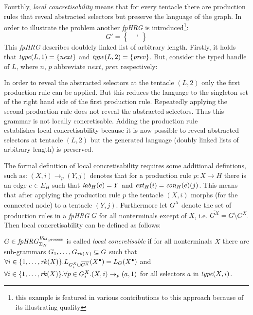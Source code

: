 	Fourthly, \emph{local concretisability} means that for every tentacle there
	are production rules that reveal abstracted selectors but preserve the
	language of the graph. In order to illustrate the problem another
	\emph{\ac{fpHRG}} is introduced\footnote{this example is featured in
		various contributions to this approach \cites{InformalGraphGrammars}
		{InductivePredicates} because of its illustrating quality}:
	\begin{equation*}
		\label{eq:G'}
		G' = \left\{
			\begin{aligned}
				&,\\
				&
			\end{aligned}
		\right\}
	\end{equation*}
	This \emph{\ac{fpHRG}} describes doublely linked list of arbitrary length.
	Firstly, it holds that
	$\mathit{type}(L,1) = \{\mathit{next}\}$ and $\mathit{type}(L,2) = \{\mathit{prev}\}$. But,
	consider the typed handle of $L$, where $n$, $p$ abbreviate $\mathit{next}$,
	$\mathit{prev}$ respectively:
	\begin{center}
		
	\end{center}
	In order to reveal the abstracted selectors at the tentacle $(L,2)$ only
	the first production rule can be applied. But this reduces the language to
	the singleton set of the right hand side of the first production rule.
	Repeatedly applying the second production rule does not reveal the
	abstracted selectors. Thus this grammar is not locally concretisable.
	Adding the production rule
	\begin{equation*}
		\label{eq:listrule3}
		
	\end{equation*}
	establishes local concretisability because it is now possible to reveal
	abstracted selectors at tentacle $(L,2)$ but the generated language (doubly
	linked lists of arbitrary length) is preserved.
	
	The formal definition of local concretisability requires some additional
	defintions, such as: $(X, i)\rightarrow_{p}(Y,j)$ denotes that for a
	production rule $p\colon X\rightarrow H$ there is an edge $e\in E_{H}$ such that
	$\mathit{lab}_{H}(e) = Y$ and $\mathit{ext}_{H}(i) = \mathit{con}_{H}(e)(j)$. This means that after
	applying the production rule $p$ the tentacle $(X, i)$ morphs (for the
	connected node) to a tentacle $(Y, j)$. Furthermore let $\overline{G^{X}}$
	denote the set of production rules in a \emph{\ac{fpHRG}} $G$ for all
	nonterminals except of $X$, i.e. $\overline{G^{X}} = G\setminus G^{X}$. Then
	local concretisability can be defined as follows:
	\begin{definition}
		$G\in\mathit{fpHRG}_{\Sigma_{N}}^{\mathit{Var}_{\text{process}}}$ is called \emph{local concretisable} if for all nonterminals
		$X$ there are sub-grammars $G_{1},\dots,G_{\mathit{rk}(X)}\subseteq G$ such
		that $\forall i\in\{1,\dots,\mathit{rk}(X)\}.L_{G_{i}^{X}\cup\overline{G^{X}}}
		(X^{\bullet})=L_{G}(X^{\bullet})$ and $\forall i\in\{1,\dots,\mathit{rk}(X)\}.
		\forall p\in G_{i}^{X}.(X,i)\rightarrow_{p}(a,1)$ for all selectors $a$
		in $\mathit{type}(X,i)$.
	\end{definition}

